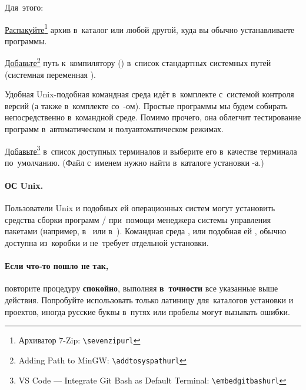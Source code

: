 Для~этого:
\begin{itemfeature}
	\item \href{\sevenzipurl}{Распакуйте}\footnote{Архиватор 7-Zip: \nolinkurl{\sevenzipurl}} архив  в~каталог  или любой другой, куда вы обычно устанавливаете программы.

	\item \href{\addtosyspathurl}{Добавьте}\footnote{Adding Path to MinGW: \nolinkurl{\addtosyspathurl}} путь к~компилятору () в~список стандартных системных путей (системная переменная ).
\end{itemfeature}

Удобная Unix-подобная командная среда  идёт в~комплекте с~системой контроля версий \git{} (а также в~комплекте со~-ом). Простые программы мы будем собирать непосредственно в~командной среде. Помимо прочего, она облегчит тестирование программ в~автоматическом и полуавтоматическом режимах.

\href{\embedgitbashurl}{Добавьте}\footnote{\textenglish{VS Code --- Integrate Git Bash as Default Terminal}: \nolinkurl{\embedgitbashurl}}  в~список доступных терминалов  и выберите его в~качестве терминала по~умолчанию. (Файл с~именем  нужно найти в~каталоге установки -а.)



\paragraph{ОС Unix.}
Пользователи Unix и подобных ей операционных систем могут установить средства сборки программ /\GCC{} при~помощи менеджера системы управления пакетами (например,  в~ или  в~). Командная среда , или подобная ей , обычно доступна из~коробки и не~требует отдельной установки.



\paragraph{Если что-то пошло не так,}
повторите процедуру \textbf{спокойно}, выполняя \textbf{в~точности} все указанные выше действия. Попробуйте использовать только латиницу для~каталогов установки и проектов, иногда русские буквы в~путях или пробелы могут вызывать ошибки.



